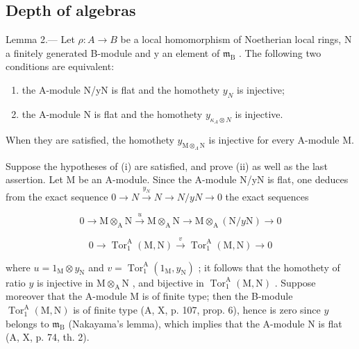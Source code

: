 \subsection{Depth of algebras}

Lemma 2.--- Let \(\rho: A \to B\) be a local homomorphism of Noetherian local rings, N a finitely generated B-module and y an element of \(\mathfrak{m}_{\mathrm{B}}\) . The following two conditions are equivalent:

\begin{enumerate}
\def\labelenumi{(\roman{enumi})}
\item
  the A-module N/yN is flat and the homothety \(y_{N}\) is injective;
\item
  the A-module N is flat and the homothety \(y_{\kappa_{A}\otimes N}\) is injective.
\end{enumerate}

When they are satisfied, the homothety \(y_{\mathrm{M} \otimes_{\Lambda}\mathrm{N}}\) is injective for every A-module M.

Suppose the hypotheses of (i) are satisfied, and prove (ii) as well as the last assertion. Let M be an A-module. Since the A-module N/yN is flat, one deduces from the exact sequence \(0 \rightarrow N \xrightarrow{y_{N}} N \longrightarrow N/yN \rightarrow 0\) the exact sequences

\[
0 \rightarrow \mathrm{M} \otimes_ {\mathrm{A}} \mathrm{N} \xrightarrow {u} \mathrm{M} \otimes_ {\mathrm{A}} \mathrm{N} \longrightarrow \mathrm{M} \otimes_ {\mathrm{A}} (\mathrm{N} / y \mathrm{N}) \rightarrow 0
\]

\[
0 \to \operatorname{Tor} _ {1} ^ {\mathrm{A}} (\mathrm{M}, \mathrm{N}) \stackrel {v} {\longrightarrow} \operatorname{Tor} _ {1} ^ {\mathrm{A}} (\mathrm{M}, \mathrm{N}) \to 0
\]

where \(u = 1_{\mathrm{M}} \otimes y_{\mathrm{N}}\) and \(v = \operatorname{Tor}_1^{\mathrm{A}}(1_{\mathrm{M}}, y_{\mathrm{N}})\) ; it follows that the homothety of ratio \(y\) is injective in \(\mathrm{M} \otimes_{\mathrm{A}} \mathrm{N}\) , and bijective in \(\operatorname{Tor}_1^{\mathrm{A}}(\mathrm{M}, \mathrm{N})\) . Suppose moreover that the A-module \(\mathrm{M}\) is of finite type; then the B-module \(\operatorname{Tor}_1^{\mathrm{A}}(\mathrm{M}, \mathrm{N})\) is of finite type (A, X, p. 107, prop. 6), hence is zero since \(y\) belongs to \(\mathfrak{m}_{\mathrm{B}}\) (Nakayama's lemma), which implies that the A-module \(\mathrm{N}\) is flat (A, X, p. 74, th. 2).

